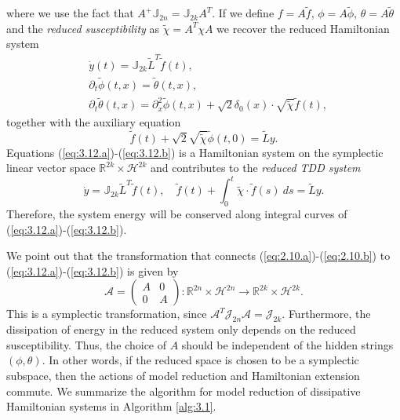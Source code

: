 where we use the fact that $A^+\mathbb J_{2n} = \mathbb{J}_{2k} A^T$. If we define $f = A \tilde f$, $\phi = A \tilde \phi$, $\theta = A\tilde \theta$ and the \emph{reduced susceptibility} as $\tilde \chi = A^T \chi A$ we recover the reduced Hamiltonian system
\begin{subequations}
\begin{align}
		\label{eq:3.12.a} & \dot{y}(t) = \mathbb J_{2k} {\tilde L}^T \tilde f(t), \\
		\label{eq:3.12.c} & \partial_t \tilde \phi(t,x) = \tilde \theta(t,x),\\
		\label{eq:3.12.b} & \partial_t \tilde \theta(t,x) = \partial_x^2 \tilde \phi(t,x) + \sqrt 2 \delta_0(x) \cdot \sqrt{\tilde \chi}  \tilde f(t),
\end{align}
\end{subequations}
together with the auxiliary equation
\begin{equation} \label{eq:3.13}
	\tilde f(t) + \sqrt{2} \sqrt{\tilde \chi} \tilde \phi(t,0) = \tilde L y.
\end{equation}
Equations (\ref{eq:3.12.a})-(\ref{eq:3.12.b}) is a Hamiltonian system on the symplectic linear vector space $\mathbb R^{2k} \times \mathcal H^{2k}$ and contributes to the \emph{reduced TDD system}
\begin{equation}
	\dot {y} = \mathbb J_{2k} \tilde L^T \tilde f(t), \quad \tilde f(t) + \int_0^t \tilde \chi\cdot \tilde f(s)\ ds = \tilde L y.
\end{equation}
Therefore, the system energy will be conserved along integral curves of (\ref{eq:3.12.a})-(\ref{eq:3.12.b}).

We point out that the transformation that connects (\ref{eq:2.10.a})-(\ref{eq:2.10.b}) to (\ref{eq:3.12.a})-(\ref{eq:3.12.b}) is given by
\begin{equation}
	\mathcal A = \begin{pmatrix}
		A& 0 \\
		0& A
	\end{pmatrix} : \mathbb R^{2n} \times \mathcal H^{2n} \to \mathbb R^{2k} \times \mathcal H^{2k}.
\end{equation}
This is a symplectic transformation, since $\mathcal A^T \mathcal J_{2n} \mathcal A = \mathcal J_{2k}$. Furthermore, the dissipation of energy in the reduced system only depends on the reduced susceptibility. Thus, the choice of $A$ should be independent of the hidden strings $(\phi, \theta)$. In other words, if the reduced space is chosen to be a symplectic subspace, then the actions of model reduction and Hamiltonian extension commute. We summarize the algorithm for model reduction of dissipative Hamiltonian systems in Algorithm \ref{alg:3.1}.

